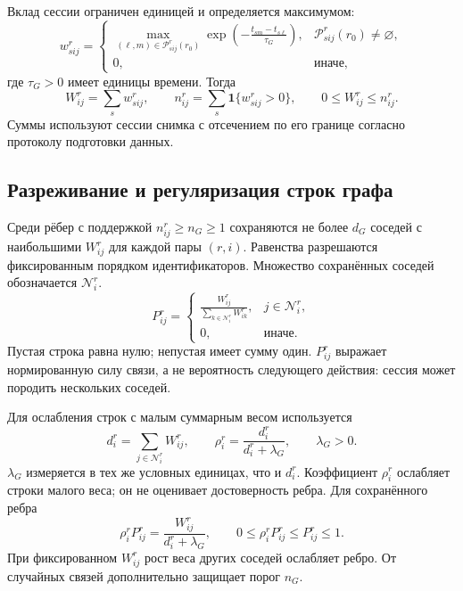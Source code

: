 \documentclass[12pt,a4paper]{article}
\newcommand{\ind}{\mathbf 1}
\theoremstyle{plainru}
\begin{document}
Вклад сессии ограничен единицей и определяется максимумом:
\begin{equation}\label{eq:model-session-edge}
w^r_{sij}=
\begin{cases}
\displaystyle\max_{(\ell,m)\in\mathcal P^r_{sij}(r_0)}
\exp\!\left(-\frac{t_{sm}-t_{s\ell}}{\tau_G}\right),
&\mathcal P^r_{sij}(r_0)\ne\varnothing,\\[0.4em]
0,&\text{иначе},
\end{cases}
\end{equation}
где $\tau_G>0$ имеет единицы времени. Тогда
\begin{equation}\label{eq:model-edge-weight}
W^r_{ij}=\sum_s w^r_{sij},\qquad
n^r_{ij}=\sum_s\ind\{w^r_{sij}>0\},\qquad
0\le W^r_{ij}\le n^r_{ij}.
\end{equation}
Суммы используют сессии снимка с отсечением по его границе
согласно протоколу подготовки данных.

\subsection{Разреживание и регуляризация строк графа}

Среди рёбер с поддержкой $n^r_{ij}\ge n_G\ge1$ сохраняются
не более $d_G$ соседей с наибольшими $W^r_{ij}$ для каждой пары $(r,i)$.
Равенства разрешаются фиксированным порядком идентификаторов.
Множество сохранённых соседей обозначается $\mathcal N^r_i$.
\begin{equation}\label{eq:model-transition}
P^r_{ij}=
\begin{cases}
\displaystyle\frac{W^r_{ij}}
 {\sum_{k\in\mathcal N^r_i}W^r_{ik}},
&j\in\mathcal N^r_i,\\[0.4em]
0,&\text{иначе}.
\end{cases}
\end{equation}
Пустая строка равна нулю; непустая имеет сумму один.
$P^r_{ij}$ выражает нормированную силу связи, а не вероятность
следующего действия: сессия может породить нескольких соседей.

Для ослабления строк с малым суммарным весом используется
\begin{equation}\label{eq:model-edge-confidence}
d^r_i=\sum_{j\in\mathcal N^r_i}W^r_{ij},\qquad
\rho^r_i=\frac{d^r_i}{d^r_i+\lambda_G},\qquad \lambda_G>0.
\end{equation}
$\lambda_G$ измеряется в тех же условных единицах, что и $d^r_i$.
Коэффициент $\rho^r_i$ ослабляет строки малого веса;
он не оценивает достоверность ребра. Для сохранённого ребра
\begin{equation}\label{eq:model-row-regularization}
\rho_i^rP_{ij}^r=\frac{W_{ij}^r}{d_i^r+\lambda_G},
\qquad
0\le \rho_i^rP_{ij}^r\le P_{ij}^r\le1.
\end{equation}
При фиксированном $W_{ij}^r$ рост веса других соседей ослабляет ребро.
От случайных связей дополнительно защищает порог $n_G$.
\end{document}
